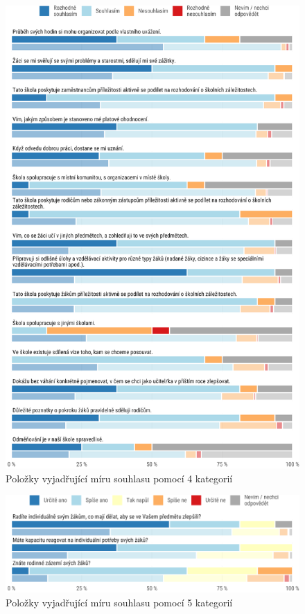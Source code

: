 \documentclass[12pt,a4paper,]{report}
\begin{document}
\begin{figure}

{\centering \includegraphics[width=\textwidth]{figs/likert-1} 

}

\caption{Položky vyjadřující míru souhlasu pomocí 4 kategorií}\label{fig:likert}
\end{figure}

\begin{figure}

{\centering \includegraphics[width=\textwidth]{figs/midpoint-1} 

}

\caption{Položky vyjadřující míru souhlasu pomocí 5 kategorií}\label{fig:midpoint}
\end{figure}
\end{document}
